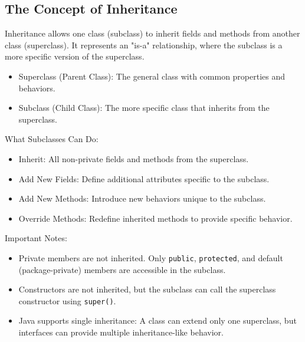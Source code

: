 \documentclass[letterpaper,12pt]{article}
\begin{document}
\subsection{The Concept of Inheritance}
Inheritance allows one class (subclass) to inherit fields and methods from another class (superclass). It represents an "is-a" relationship, where the subclass is a more specific version of the superclass.
\begin{itemize}
    \item Superclass (Parent Class): The general class with common properties and behaviors.
    \item Subclass (Child Class): The more specific class that inherits from the superclass.
\end{itemize}
What Subclasses Can Do:
\begin{itemize}
    \item Inherit: All non-private fields and methods from the superclass.
    \item Add New Fields: Define additional attributes specific to the subclass.
    \item Add New Methods: Introduce new behaviors unique to the subclass.
    \item Override Methods: Redefine inherited methods to provide specific behavior.
\end{itemize}
Important Notes:
\begin{itemize}
    \item Private members are not inherited. Only \texttt{public}, \texttt{protected}, and default (package-private) members are accessible in the subclass.
    \item Constructors are not inherited, but the subclass can call the superclass constructor using \texttt{super()}.
    \item Java supports single inheritance: A class can extend only one superclass, but interfaces can provide multiple inheritance-like behavior.
\end{itemize}
\end{document}
